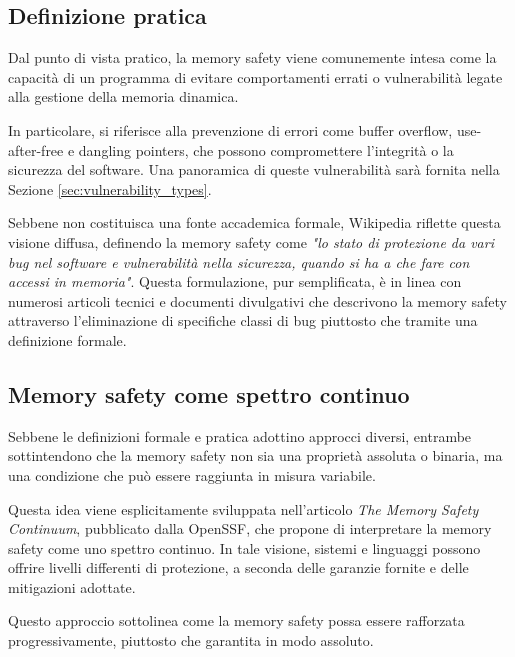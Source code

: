 \subsection{Definizione pratica}
\label{sec:practical_definition}

Dal punto di vista pratico, la memory safety viene comunemente intesa come la capacità
di un programma di evitare comportamenti errati o vulnerabilità legate alla gestione
della memoria dinamica.

In particolare, si riferisce alla prevenzione di errori come buffer overflow, use-after-free
e dangling pointers, che possono compromettere l'integrità o la sicurezza del
software. Una panoramica di queste vulnerabilità sarà fornita nella Sezione \ref{sec:vulnerability_types}.

Sebbene non costituisca una fonte accademica formale, Wikipedia\cite{wikipedia_definition}
riflette questa visione diffusa, definendo la memory safety come \textit{"lo stato
di protezione da vari bug nel software e vulnerabilità nella sicurezza, quando
si ha a che fare con accessi in memoria"}. Questa formulazione, pur semplificata,
è in linea con numerosi articoli tecnici e documenti divulgativi che descrivono
la memory safety attraverso l'eliminazione di specifiche classi di bug piuttosto
che tramite una definizione formale.

\subsection{Memory safety come spettro continuo}
\label{sec:continuum_definition}

Sebbene le definizioni formale e pratica adottino approcci diversi, entrambe
sottintendono che la memory safety non sia una proprietà assoluta o binaria, ma una
condizione che può essere raggiunta in misura variabile.

Questa idea viene esplicitamente sviluppata nell'articolo \textit{The Memory
Safety Continuum}\cite{memory_safety_continuum}, pubblicato dalla OpenSSF, che propone
di interpretare la memory safety come uno spettro continuo. In tale visione, sistemi
e linguaggi possono offrire livelli differenti di protezione, a seconda delle
garanzie fornite e delle mitigazioni adottate.

Questo approccio sottolinea come la memory safety possa essere rafforzata
progressivamente, piuttosto che garantita in modo assoluto.